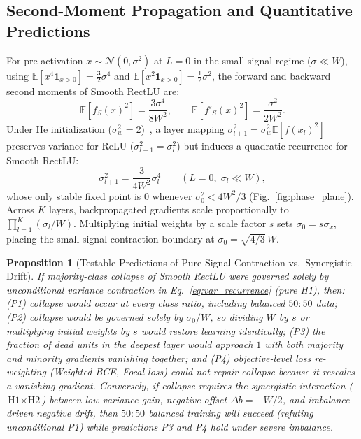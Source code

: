 \documentclass[10pt,a4paper]{article}
\newtheorem{proposition}{Proposition}
\begin{document}
\subsection{Second-Moment Propagation and Quantitative Predictions}
For pre-activation $x \sim \mathcal{N}(0, \sigma^2)$ at $L=0$ in the small-signal regime ($\sigma \ll W$), using $\mathbb{E}[x^4 \mathbf{1}_{x>0}] = \frac{3}{2}\sigma^4$ and $\mathbb{E}[x^2 \mathbf{1}_{x>0}] = \frac{1}{2}\sigma^2$, the forward and backward second moments of Smooth RectLU are:
\begin{equation}
    \mathbb{E}[f_S(x)^2] = \frac{3\sigma^4}{8W^2}, \qquad \mathbb{E}[f'_S(x)^2] = \frac{\sigma^2}{2W^2}.
    \label{eq:moments}
\end{equation}
Under He initialization ($\sigma_w^2 = 2$)~\cite{he2015}, a layer mapping $\sigma_{l+1}^2 = \sigma_w^2 \mathbb{E}[f(x_l)^2]$ preserves variance for ReLU ($\sigma_{l+1}^2 = \sigma_l^2$) but induces a quadratic recurrence for Smooth RectLU:
\begin{equation}
    \sigma_{l+1}^2 = \frac{3}{4W^2}\sigma_l^4 \qquad (L=0, \; \sigma_l \ll W),
    \label{eq:var_recurrence}
\end{equation}
whose only stable fixed point is $0$ whenever $\sigma_0^2 < 4W^2/3$ (Fig.~\ref{fig:phase_plane}). Across $K$ layers, backpropagated gradients scale proportionally to $\prod_{l=1}^K (\sigma_l / W)$. Multiplying initial weights by a scale factor $s$ sets $\sigma_0 = s\sigma_x$, placing the small-signal contraction boundary at $\sigma_0 = \sqrt{4/3}\,W$.

\begin{proposition}[Testable Predictions of Pure Signal Contraction vs.\ Synergistic Drift]
\label{prop:h1}
If majority-class collapse of Smooth RectLU were governed solely by unconditional variance contraction in Eq.~\eqref{eq:var_recurrence} (pure H1), then: (P1) collapse would occur at every class ratio, including balanced $50:50$ data; (P2) collapse would be governed solely by $\sigma_0/W$, so dividing $W$ by $s$ or multiplying initial weights by $s$ would restore learning identically; (P3) the fraction of dead units in the deepest layer would approach $1$ with both majority and minority gradients vanishing together; and (P4) objective-level loss re-weighting (Weighted BCE, Focal loss) could not repair collapse because it rescales a vanishing gradient. Conversely, if collapse requires the synergistic interaction ($\text{H1} \times \text{H2}$) between low variance gain, negative offset $\Delta b = -W/2$, and imbalance-driven negative drift, then $50:50$ balanced training will succeed (refuting unconditional P1) while predictions P3 and P4 hold under severe imbalance.
\end{proposition}
\end{document}
